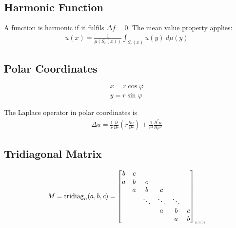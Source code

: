 \subsection{Harmonic Function}

A function is harmonic if it fulfils $\Delta f = 0$. The mean value property applies:
\begin{align*}
    u(x) = \frac{1}{\mu(S_r(x))}\int_{S_r(x)}u(y)\ d\mu(y)
\end{align*}

\subsection{Polar Coordinates}
\begin{align*}
    x = r\cos \varphi \\
    y = r\sin \varphi
\end{align*}

The Laplace operator in polar coordinates is
\begin{align*}
    \Delta u = \frac{1}{r}\frac{\partial}{\partial r}
    \left(r\frac{\partial u}{\partial r}\right)
    +\frac{1}{r^2}\frac{\partial^2 u}{\partial \varphi^2}
\end{align*}

\subsection{Tridiagonal Matrix}
\begin{align*}
    M = \mathrm{tridiag}_{n}(a, b, c) =
    \begin{bmatrix}
        b & c &        &        &        &   \\
        a & b & c      &        &        &   \\
        & a & b      & c      &        &   \\
        &   & \ddots & \ddots & \ddots &   \\
        &   &        & a      & b      & c \\
        &   &        &        & a      & b
    \end{bmatrix}_{\color{gray}n\times n}
\end{align*}
